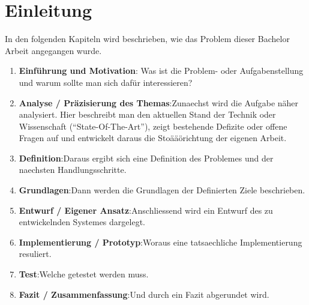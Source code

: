 \chapter{Einleitung}

In den folgenden Kapiteln wird beschrieben, wie das Problem dieser Bachelor Arbeit angegangen wurde.
\begin{enumerate}
\item \textbf{Einführung und Motivation}: Was ist die Problem- oder Aufgabenstellung und warum sollte man sich dafür interessieren?
\item \textbf{Analyse / Präzisierung des Themas}:Zunaechst wird die Aufgabe näher analysiert. Hier beschreibt man den aktuellen Stand der Technik oder Wissenschaft ("`State-Of-The-Art"'), zeigt bestehende
							Defizite oder offene Fragen auf und entwickelt daraus die Stoääörichtung der eigenen Arbeit.
\item \textbf{Definition}:Daraus ergibt sich eine Definition des Problemes und der naechsten Handlungsschritte.
\item \textbf{Grundlagen}:Dann werden die Grundlagen der Definierten Ziele beschrieben.
\item \textbf{Entwurf / Eigener Ansatz}:Anschliessend wird ein Entwurf des zu entwickelnden Systemes dargelegt.
\item \textbf{Implementierung / Prototyp}:Woraus eine tatsaechliche Implementierung resuliert.
\item \textbf{Test}:Welche getestet werden muss.
\item \textbf{Fazit / Zusammenfassung}:Und durch ein Fazit abgerundet wird.
\end{enumerate}